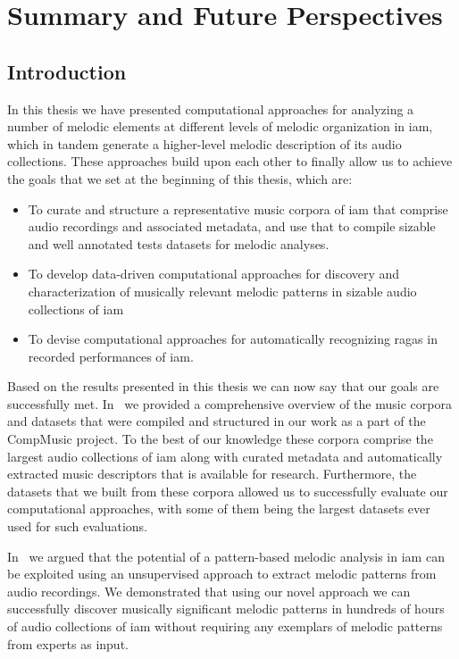 
\chapter{Summary and Future Perspectives}
\label{chap:summary_future_work}

\section{Introduction}
\label{sec:summary_thesis}

 In this thesis we have presented computational approaches for analyzing a number of melodic elements at different levels of melodic organization in \gls{iam}, which in tandem generate a higher-level melodic description of its audio collections. These approaches build upon each other to finally allow us to achieve the goals that we set at the beginning of this thesis, which are: 
 
 \begin{itemize}
 	\item To curate and structure a representative music corpora of \gls{iam} that comprise audio recordings and associated metadata, and use that to compile sizable and well annotated tests datasets for melodic analyses.
 	\item To develop data-driven computational approaches for discovery and characterization of musically relevant melodic patterns in sizable audio collections of \gls{iam}
 	\item To devise computational approaches for automatically recognizing \glspl{raga} in recorded performances of \gls{iam}.
 \end{itemize}
 
 Based on the results presented in this thesis we can now say that our goals are successfully met. In~ we provided a comprehensive overview of the music corpora and datasets that were compiled and structured in our work as a part of the CompMusic project. To the best of our knowledge these corpora comprise the largest audio collections of \gls{iam} along with curated metadata and automatically extracted music descriptors that is available for research. Furthermore, the datasets that we built from these corpora allowed us to successfully evaluate our computational approaches, with some of them being the largest datasets ever used for such evaluations. 
 
 In~ we argued that the potential of a pattern-based melodic analysis in \gls{iam} can be exploited using an unsupervised approach to extract melodic patterns from audio recordings. We demonstrated that using our novel approach we can successfully discover musically significant melodic patterns in hundreds of hours of audio collections of \gls{iam} without requiring any exemplars of melodic patterns from experts as input.
 
